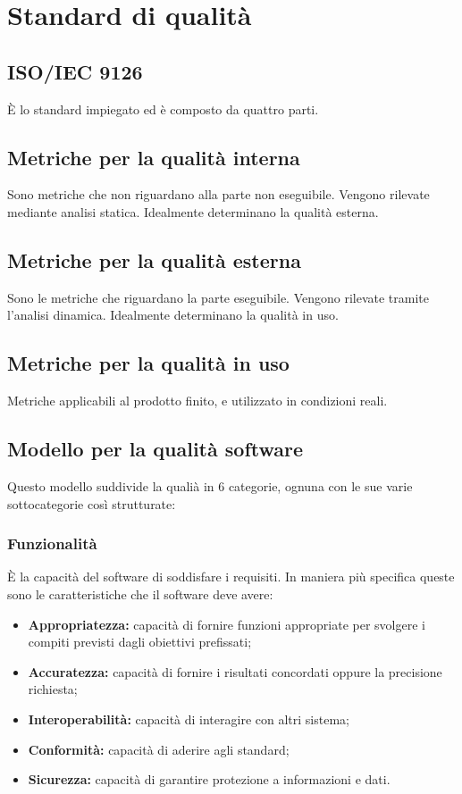 \section{Standard di qualit\`a}
\subsection{ISO/IEC 9126}
\`E lo standard impiegato ed \`e composto da quattro parti.
\subsection{Metriche per la qualit\`a interna}
Sono metriche che non riguardano alla parte non eseguibile. Vengono rilevate mediante analisi statica. Idealmente determinano la qualit\`a esterna.
\subsection{Metriche per la qualit\`a esterna}
Sono le metriche che riguardano la parte eseguibile. Vengono rilevate tramite l'analisi dinamica. Idealmente determinano la qualit\`a in uso.
\subsection{Metriche per la qualit\`a in uso}
Metriche applicabili al prodotto finito, e utilizzato in condizioni reali.
\subsection{Modello per la qualit\`a software}
Questo modello suddivide la quali\`a in 6 categorie, ognuna con le sue varie sottocategorie cos\`i strutturate:
\subsubsection{Funzionalit\`a}
\`E la capacit\`a del software di soddisfare i requisiti. In maniera pi\`u specifica queste sono le caratteristiche che il software deve avere:
\begin{itemize}
    \item \textbf{Appropriatezza:} capacit\`a di fornire funzioni appropriate per svolgere i compiti previsti dagli obiettivi prefissati;
    \item \textbf{Accuratezza:} capacit\`a di fornire i risultati concordati oppure la precisione richiesta;
    \item \textbf{Interoperabilit\`a:} capacit\`a  di interagire con altri sistema;
    \item \textbf{Conformit\`a:} capacit\`a di aderire agli standard;
    \item \textbf{Sicurezza:} capacit\`a di garantire protezione a informazioni e dati.
\end{itemize}
